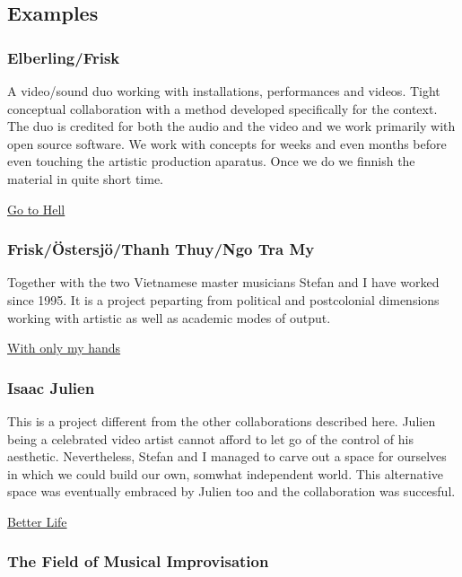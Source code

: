 \documentclass[a4paper,hidelinks]{article}
\begin{document}
\subsection{Examples}

\subsubsection{Elberling/Frisk}

A video/sound duo working with installations, performances and videos. Tight conceptual collaboration with a method developed specifically for the context. The duo is credited for both the audio and the video and we work primarily with open source software. We work with concepts for weeks and even months before even touching the artistic production aparatus. Once we do we finnish the material in quite short time. 

\href{http://www.henrikfrisk.com/index.jsp?metaId=res\&id=music\&field=date\&query=2013-10-01\&show=-1}{Go to Hell}

\subsubsection{Frisk/Östersjö/Thanh Thuy/Ngo Tra My}

Together with the two Vietnamese master musicians Stefan and I have worked since 1995. It is a project peparting from political and postcolonial dimensions working with artistic as well as academic modes of output.

\href{http://www.henrikfrisk.com/index.jsp?metaId=res\&id=music\&field=date\&query=2013-05-15\&show=-1}{With only my hands}

\subsubsection{Isaac Julien}

This is a project different from the other collaborations described here. Julien being a celebrated video artist cannot afford to let go of the control of his aesthetic. Nevertheless, Stefan and I managed to carve out a space for ourselves in which we could build our own, somwhat independent world. This alternative space was eventually embraced by Julien too and the collaboration was succesful.

\href{http://www.henrikfrisk.com/index.jsp?metaId=res\&id=music\&field=date\&query=2011-09-11\&show=-1}{Better Life}

\subsubsection{The Field of Musical Improvisation}
\end{document}
